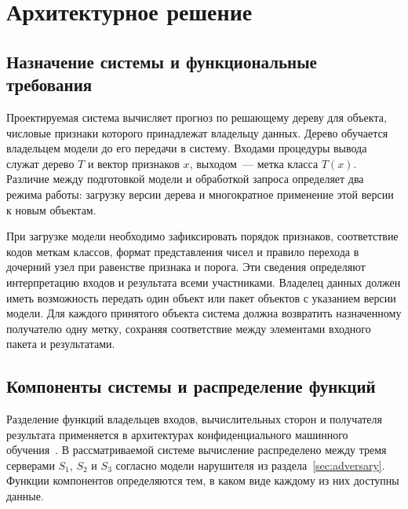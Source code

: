 \section{Архитектурное решение}
\label{sec:architecture}

\subsection{Назначение системы и функциональные требования}

Проектируемая система вычисляет прогноз по решающему дереву для объекта,
числовые признаки которого принадлежат владельцу данных. Дерево обучается
владельцем модели до его передачи в систему. Входами процедуры вывода
служат дерево $T$ и вектор признаков $x$, выходом~--- метка класса $T(x)$.
Различие между подготовкой модели и обработкой запроса определяет два
режима работы: загрузку версии дерева и многократное применение этой
версии к новым объектам.

При загрузке модели необходимо зафиксировать порядок признаков,
соответствие кодов меткам классов, формат представления чисел и правило
перехода в дочерний узел при равенстве признака и порога. Эти сведения
определяют интерпретацию входов и результата всеми участниками. Владелец
данных должен иметь возможность передать один объект или пакет объектов
с указанием версии модели. Для каждого принятого объекта система должна
возвратить назначенному получателю одну метку, сохраняя соответствие между
элементами входного пакета и результатами.

\subsection{Компоненты системы и распределение функций}

Разделение функций владельцев входов, вычислительных сторон и получателя
результата применяется в архитектурах конфиденциального машинного
обучения~\cite{zapechnikov2021two,zapechnikov2022three}. В рассматриваемой
системе вычисление распределено между тремя серверами $S_1$, $S_2$ и
$S_3$ согласно модели нарушителя из раздела~\ref{sec:adversary}.
Функции компонентов определяются тем, в каком виде каждому из них
доступны данные.

